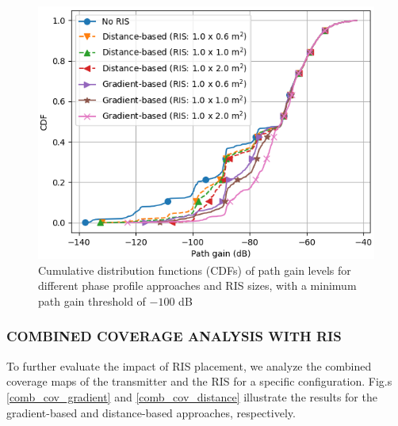 \documentclass{IEEEoj}
\begin{document}
\begin{figure}
	\centering \includegraphics[width=\linewidth]{Sim_Results/CDF_-100dB.png}
	\caption{Cumulative distribution functions (CDFs) of path gain levels for different phase profile approaches and RIS sizes, with a minimum path gain threshold of $-100$ dB}
	\label{CDF_-100dB}
\end{figure}

\subsubsection{COMBINED COVERAGE ANALYSIS WITH RIS}
To further evaluate the impact of RIS placement, we analyze the combined coverage maps of the transmitter and the RIS for a specific configuration. Fig.s \ref{comb_cov_gradient} and \ref{comb_cov_distance} illustrate the results for the gradient-based and distance-based approaches, respectively.
\end{document}
